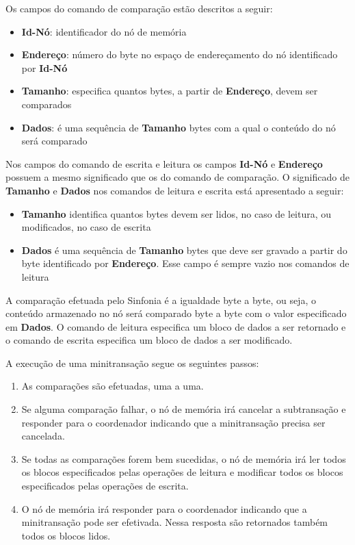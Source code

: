 \documentclass[11pt,twoside,a4paper]{book}
\begin{document}
Os campos do comando de comparação estão descritos a seguir:

\begin{itemize}
	\item \textbf{Id-Nó}: identificador do nó de memória
	\item \textbf{Endereço}: número do byte no espaço de endereçamento do nó identificado por \textbf{Id-Nó}
	\item \textbf{Tamanho}: especifica quantos bytes, a partir de \textbf{Endereço}, devem ser comparados
	\item \textbf{Dados}: é uma sequência de \textbf{Tamanho} bytes com a qual o conteúdo do nó será comparado
\end{itemize}

Nos campos do comando de escrita e leitura os campos \textbf{Id-Nó} e \textbf{Endereço} possuem a mesmo significado que os do comando de comparação. O significado de \textbf{Tamanho} e \textbf{Dados} nos comandos de leitura e escrita está apresentado a seguir:

\begin{itemize}
	\item \textbf{Tamanho} identifica quantos bytes devem ser lidos, no caso de leitura, ou modificados, no caso de escrita
	\item \textbf{Dados} é uma sequência de \textbf{Tamanho} bytes que deve ser gravado a partir do byte identificado por \textbf{Endereço}. Esse campo é sempre vazio nos comandos de leitura
\end{itemize}

A comparação efetuada pelo Sinfonia é a igualdade byte a byte, ou seja, o conteúdo armazenado no nó será comparado byte a byte com o valor especificado em \textbf{Dados}. O comando de leitura especifica um bloco de dados a ser retornado e o comando de escrita especifica um bloco de dados a ser modificado.

A execução de uma minitransação segue os seguintes passos:

\begin{enumerate}
	\item As comparações são efetuadas, uma a uma.
	\item Se alguma comparação falhar, o nó de memória irá cancelar a subtransação e responder para o coordenador indicando que a minitransação precisa ser cancelada.
	\item Se todas as comparações forem bem sucedidas, o nó de memória irá ler todos os blocos especificados pelas operações de leitura e modificar todos os blocos especificados pelas operações de escrita.
	\item O nó de memória irá responder para o coordenador indicando que a minitransação pode ser efetivada. Nessa resposta são retornados também todos os blocos lidos.
\end{enumerate}
\end{document}
